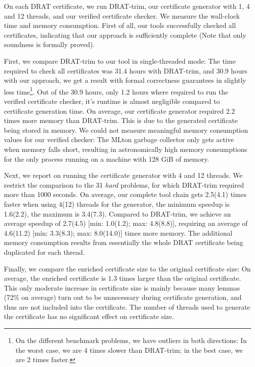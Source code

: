 \documentclass{llncs}
\begin{document}
On each DRAT certificate, we run DRAT-trim, our certificate generator with 1, 4 and 12 threads, and our verified certificate checker. 
We measure the wall-clock time and memory consumption. First of all, our tools successfully checked all certificates, indicating that our approach is sufficiently complete (Note that only soundness is formally proved). 

First, we compare DRAT-trim to our tool in single-threaded mode: The time required to check all certificates was 31.4 hours with DRAT-trim, and 30.9 hours with our approach, \ie we 
get a result with formal correctness guarantees in slightly less time\footnote{On the different benchmark problems, we have outliers in both directions: In the worst case, we are 4 times slower than DRAT-trim; in the best case, we are 2 times faster.}. Out of the 30.9 hours, only 1.2 hours where required to run the verified certificate checker, \ie it's runtime is almost negligible compared to certificate generation time. On average, our certificate generator required 2.2 times more memory than DRAT-trim. This is due to the generated certificate being stored 
in memory. We could not measure meaningful memory consumption values for our verified checker: The MLton garbage collector only gets active when memory falls short, 
resulting in astronomically high memory consumptions for the only process running on a machine with 128 GiB of memory.

Next, we report on running the certificate generator with 4 and 12 threads. 
We restrict the comparison to the 31 \emph{hard} problems, for which DRAT-trim required more than 1000 seconds.
On average, our complete tool chain gets 2.5(4.1) times faster when using 4(12) threads for the generator, the minimum speedup is 1.6(2.2), the maximum is 3.4(7.3).
Compared to DRAT-trim, we achieve an average speedup of 2.7(4.5) [min: 1.0(1.2); max: 4.8(8.8)], requiring an average of 4.6(11.2) [min: 3.3(8.3); max: 8.0(14.0)] times more memory.
The additional memory consumption results from essentially the whole DRAT certificate being duplicated for each thread.

Finally, we compare the enriched certificate size to the original certificate size: On average, the enriched certificate is 1.3 times larger than the original certificate. This only moderate increase in certificate size is mainly because many lemmas (72\% on average) turn out to be unnecessary during 
certificate generation, and thus are not included into the certificate. The number of threads used to generate the certificate has no significant effect on certificate size.
\end{document}
